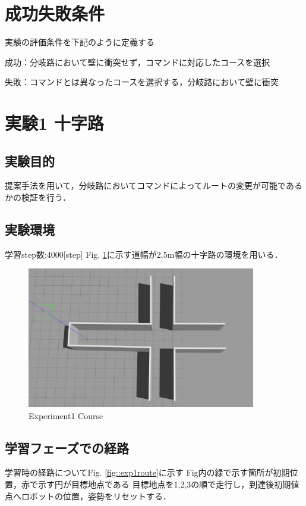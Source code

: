 \section{成功失敗条件}
実験の評価条件を下記のように定義する

成功：分岐路において壁に衝突せず，コマンドに対応したコースを選択

失敗：コマンドとは異なったコースを選択する，分岐路において壁に衝突

\newpage
\section{実験1 十字路}
\subsection{実験目的}
提案手法を用いて，分岐路においてコマンドによってルートの変更が可能であるかの検証を行う．
\subsection{実験環境}
学習step数:4000[step]
Fig. \ref{fig::zyuzi}に示す道幅が2.5m幅の十字路の環境を用いる．
\begin{figure}[ht]
    \centering
    \includegraphics[width = 10cm]{./figs/zyuuziyoko.png}
    \caption{Experiment1 Course}
    \label{fig::zyuzi}
\end{figure}

\newpage
\subsection{学習フェーズでの経路}
学習時の経路についてFig. \ref{fig::exp1route}に示す
Fig内の緑で示す箇所が初期位置，赤で示す円が目標地点である
目標地点を1,2,3の順で走行し，到達後初期値点へロボットの位置，姿勢をリセットする．

